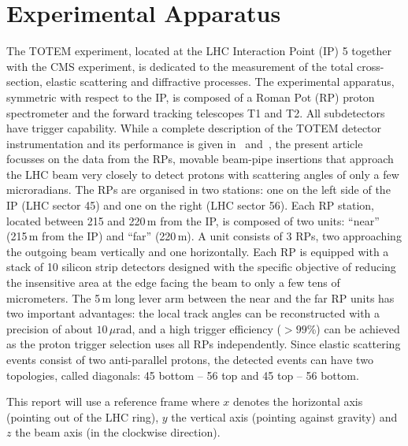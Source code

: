 \section{Experimental Apparatus}
\label{sec:exp apparatus}

The TOTEM experiment, located at the LHC Interaction Point (IP) 5 together with
the CMS experiment, is dedicated to the measurement of the total 
cross-section, elastic scattering
and diffractive processes. The experimental
apparatus, symmetric with respect to the IP, is 
composed of a Roman Pot (RP) proton spectrometer and the forward tracking 
telescopes T1 and T2. All subdetectors have trigger capability. 
While a complete description of the TOTEM detector instrumentation 
and its performance is given in~\cite{totem-jinst} and~\cite{totem-ijmp}, 
the present article focusses on the data from the RPs, movable beam-pipe
insertions that approach the LHC beam very closely to detect protons with
scattering angles of only a few microradians. 
The RPs are organised in two stations: one on the left side of the IP 
(LHC sector 45) and one on the right (LHC sector 56).
Each RP station, located between 215 and 220\,m from the IP, is composed of two 
units: ``near'' (215\,m from the IP) and ``far'' (220\,m). 
A unit consists of 3 RPs, two
approaching the outgoing beam vertically and one horizontally.
Each RP is equipped with a stack of 10 silicon
strip detectors designed with the specific objective of
reducing the insensitive area at the edge facing the beam
to only a few tens of micrometers. The 5\,m long lever arm 
between the near and the far RP units has two important
advantages: the local track angles can be reconstructed
with a precision of about $10\,\mu$rad, and a high trigger efficiency
($> 99$\%) can be achieved as the proton trigger selection
uses all RPs independently. Since elastic scattering events consist of two anti-parallel protons, the detected events can have two topologies, called diagonals: 45 bottom -- 56 top and 45 top -- 56 bottom.

This report will use a reference frame where $x$ denotes the horizontal axis (pointing out of the LHC ring), $y$ the vertical axis (pointing against gravity) and $z$ the beam axis (in the clockwise direction).
